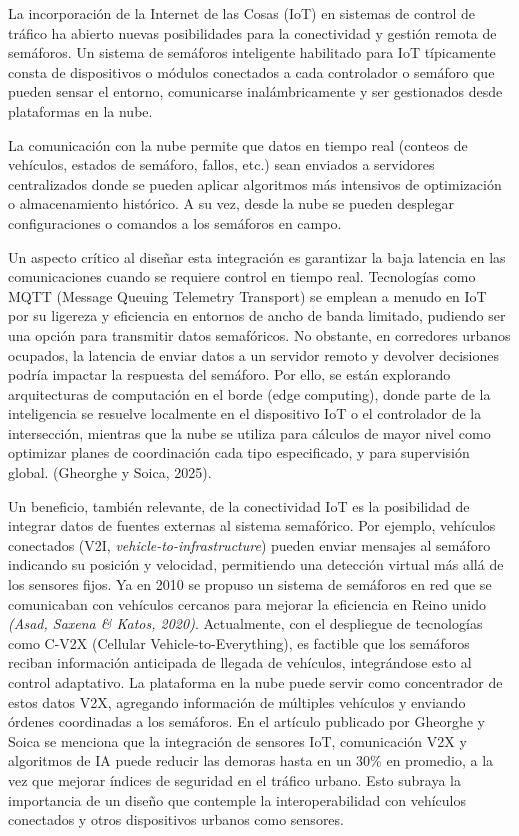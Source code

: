 \documentclass[12pt,a4paper,oneside]{report}
\begin{document}
La incorporación de la Internet de las Cosas (IoT) en sistemas de control de tráfico ha abierto nuevas posibilidades para la conectividad y gestión remota de semáforos. Un sistema de semáforos inteligente habilitado para IoT típicamente consta de dispositivos o módulos conectados a cada controlador o semáforo que pueden sensar el entorno, comunicarse inalámbricamente y ser gestionados desde plataformas en la nube.

La comunicación con la nube permite que datos en tiempo real (conteos de vehículos, estados de semáforo, fallos, etc.) sean enviados a servidores centralizados donde se pueden aplicar algoritmos más intensivos de optimización o almacenamiento histórico. A su vez, desde la nube se pueden desplegar configuraciones o comandos a los semáforos en campo.

Un aspecto crítico al diseñar esta integración es garantizar la baja latencia en las comunicaciones cuando se requiere control en tiempo real. Tecnologías como MQTT (Message Queuing Telemetry Transport) se emplean a menudo en IoT por su ligereza y eficiencia en entornos de ancho de banda limitado, pudiendo ser una opción para transmitir datos semafóricos. No obstante, en corredores urbanos ocupados, la latencia de enviar datos a un servidor remoto y devolver decisiones podría impactar la respuesta del semáforo. Por ello, se están explorando arquitecturas de computación en el borde (edge computing), donde parte de la inteligencia se resuelve localmente en el dispositivo IoT o el controlador de la intersección, mientras que la nube se utiliza para cálculos de mayor nivel como optimizar planes de coordinación cada tipo especificado, y para supervisión global. (Gheorghe y Soica, 2025).

Un beneficio, también relevante, de la conectividad IoT es la posibilidad de integrar datos de fuentes externas al sistema semafórico. Por ejemplo, vehículos conectados (V2I, \emph{vehicle-to-infrastructure}) pueden enviar mensajes al semáforo indicando su posición y velocidad, permitiendo una detección virtual más allá de los sensores fijos. Ya en 2010 se propuso un sistema de semáforos en red que se comunicaban con vehículos cercanos para mejorar la eficiencia en Reino unido \emph{(Asad, Saxena \& Katos, 2020)}. Actualmente, con el despliegue de tecnologías como C-V2X (Cellular Vehicle-to-Everything), es factible que los semáforos reciban información anticipada de llegada de vehículos, integrándose esto al control adaptativo. La plataforma en la nube puede servir como concentrador de estos datos V2X, agregando información de múltiples vehículos y enviando órdenes coordinadas a los semáforos. En el artículo publicado por Gheorghe y Soica se menciona que la integración de sensores IoT, comunicación V2X y algoritmos de IA puede reducir las demoras hasta en un 30\% en promedio, a la vez que mejorar índices de seguridad en el tráfico urbano\hspace{0pt}. Esto subraya la importancia de un diseño que contemple la interoperabilidad con vehículos conectados y otros dispositivos urbanos como sensores.
\end{document}
